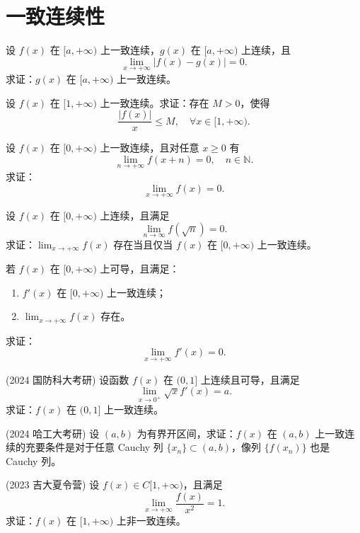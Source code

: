 \documentclass[lang=cn,10pt,thmcnt=section]{elegantbook}
\begin{document}
\section{一致连续性}
\begin{example}
	设 \( f(x) \) 在 \([a, +\infty)\) 上一致连续，\( g(x) \) 在 \([a, +\infty)\) 上连续，且
\[ \lim_{x \to +\infty} |f(x) - g(x)| = 0. \]
求证：\( g(x) \) 在 \([a, +\infty)\) 上一致连续。
\end{example}
\begin{example}
	设 \( f(x) \) 在 \([1, +\infty)\) 上一致连续。求证：存在 \( M > 0 \)，使得
\[ \frac{|f(x)|}{x} \leq M, \quad \forall x \in [1, +\infty). \]
\end{example}
\begin{example}
	设 \( f(x) \) 在 \([0, +\infty)\) 上一致连续，且对任意 \( x \geq 0 \) 有
\[ \lim_{n \to +\infty} f(x+n) = 0, \quad n \in \mathbb{N}. \]
求证：
\[ \lim_{x \to +\infty} f(x) = 0. \]
\end{example}
\begin{example}
	设 \( f(x) \) 在 \([0, +\infty)\) 上连续，且满足
\[ \lim_{n \to \infty} f(\sqrt{n}) = 0. \]
求证：\(\lim_{x \to +\infty} f(x)\) 存在当且仅当 \( f(x) \) 在 \([0, +\infty)\) 上一致连续。

\end{example}
\begin{example}
	若 \( f(x) \) 在 \([0,+\infty)\) 上可导，且满足：
\begin{enumerate}
    \item \( f'(x) \) 在 \([0,+\infty)\) 上一致连续；
    \item \( \lim_{x \to +\infty} f(x) \) 存在。
\end{enumerate}
求证：
\[ \lim_{x \to +\infty} f'(x) = 0. \]
\end{example}
\begin{example}
	(2024 国防科大考研) 设函数 \( f(x) \) 在 \( (0,1] \) 上连续且可导，且满足
    \[ \lim_{x \to 0^+} \sqrt{x}f'(x) = a. \]
    求证：\( f(x) \) 在 \( (0,1] \) 上一致连续。
\end{example}
\begin{example}
	(2024 哈工大考研) 设 \( (a,b) \) 为有界开区间，求证：\( f(x) \) 在 \( (a,b) \) 上一致连续的充要条件是对于任意 Cauchy 列 \( \{x_n\} \subset (a,b) \)，像列 \( \{f(x_n)\} \) 也是 Cauchy 列。
\end{example}
\begin{example}
	(2023 吉大夏令营) 设 \( f(x) \in C[1,+\infty) \)，且满足
    \[ \lim_{x \to +\infty} \frac{f(x)}{x^2} = 1. \]
    求证：\( f(x) \) 在 \( [1,+\infty) \) 上非一致连续。
\end{example}
\end{document}
